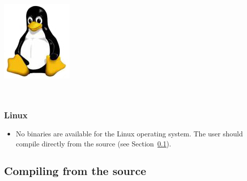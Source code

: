 \begin{flushleft}
\begin{minipage}[c]{0.074\textwidth}
\includegraphics[width=\textwidth]{doc/figures/figlogolinux.jpg}
\end{minipage}
\,
\begin{minipage}[t]{0.88\textwidth}
\subsubsection*{Linux}
\end{minipage}
\begin{itemize}
\item  No binaries are available for the Linux operating system.  The user should compile
\poy directly from the source (see Section~\ref{Compilingfromsource}). 
\end{itemize} 

\end{flushleft}

\subsection{Compiling from the source}
\label{Compilingfromsource}

